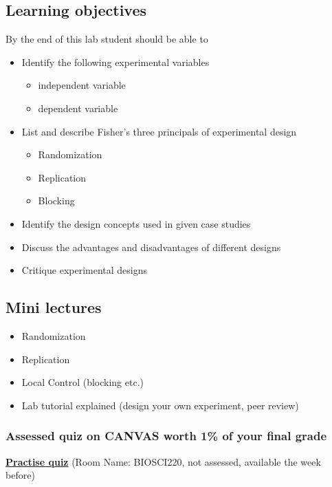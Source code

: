 \documentclass{article}
\begin{document}
\subsection*{Learning objectives}
By the end of this lab student should be able to
\begin{itemize}
\item Identify the following experimental variables
  \begin{itemize}
      \item independent variable
      \item dependent variable
        \end{itemize}
\item List and describe Fisher's three principals of experimental design
  \begin{itemize}
       \item Randomization
       \item Replication
       \item Blocking
       \end{itemize}  
   \item Identify the design concepts used in given case studies
   \item Discuss the advantages and disadvantages of different designs
   \item Critique experimental designs
\end{itemize}

\subsection*{Mini lectures}

\begin{itemize}
\item Randomization
\item Replication
\item Local Control (blocking etc.)
\item Lab tutorial explained (design your own experiment, peer review)
\end{itemize}

\subsubsection*{Assessed quiz on CANVAS worth 1\% of your final grade}

\begin{center}
  \href{https://b.socrative.com/login/student/}{\textbf{\Large Practise quiz}} (Room Name: BIOSCI220, not assessed, available the week before)
  
\end{center}
\end{document}
